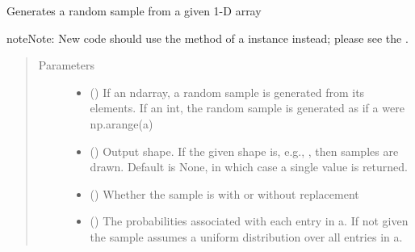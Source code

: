 \documentclass[letterpaper,10pt,english]{sphinxmanual}
\begin{document}
\begin{fulllineitems}
\label{\detokenize{doc-src/tyche:tyche.Distributions.choice}}
Generates a random sample from a given 1-D array


\begin{sphinxadmonition}{note}{Note:}
New code should use the  method of a 
instance instead; please see the .
\end{sphinxadmonition}
\begin{quote}\begin{description}
\item[{Parameters}] \leavevmode\begin{itemize}
\item {} 
 () \textendash{} If an ndarray, a random sample is generated from its elements.
If an int, the random sample is generated as if a were np.arange(a)

\item {} 
 (\sphinxstyleliteralemphasis{\sphinxupquote{, }}) \textendash{} Output shape.  If the given shape is, e.g., , then
 samples are drawn.  Default is None, in which case a
single value is returned.

\item {} 
 (\sphinxstyleliteralemphasis{\sphinxupquote{, }}) \textendash{} Whether the sample is with or without replacement

\item {} 
 (\sphinxstyleliteralemphasis{\sphinxupquote{, }}) \textendash{} The probabilities associated with each entry in a.
If not given the sample assumes a uniform distribution over all
entries in a.


\end{itemize}
\end{description}
\end{quote}
\end{fulllineitems}
\end{document}
